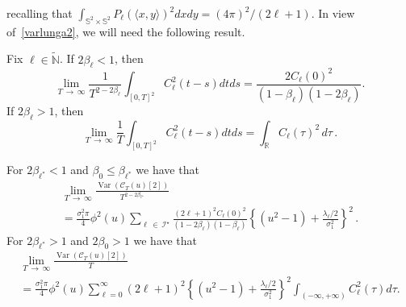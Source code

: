 \documentclass[AHL,Unicode,longabstracts,published]{cedram}
\newcommand{\clI}{\mathcal{I}}
\newcommand{\clC}{\mathcal{C}}
\newcommand{\bbS}{\mathbb{S}}
\newcommand{\bbR}{\mathbb{R}}
\newcommand{\bbN}{\mathbb{N}}
\DeclareMathOperator{\Var}{Var}
\begin{document}
\endgroup
\noindent recalling that $\int_{\bbS^{2}\times \bbS^{2}}P_{\ell }(\langle x,y\rangle)^{2}dxdy = (4\pi)^2/(2\ell+1)$. In view of~\eqref{varlunga2}, we will need the following result.

\begin{lemm}\label{lemma-var2nd}
Fix $\ell \in \widetilde{ \bbN}$. If $2\beta _{\ell}<1$, then
\begin{equation*}
\lim_{T\,\rightarrow\,\infty}\frac{1}{T^{2-2\beta _{\ell }}}
\int_{[0,T]^2}C_{\ell }^{2}(t-s)dtds=\frac{2C_{\ell }(0)^{2}}{ (1-\beta_{\ell})(1-2\beta_{\ell})}\text{.}
\end{equation*}
If $2\beta _{\ell}>1$, then
\begin{equation*}
\lim_{T\,\rightarrow\,\infty}\frac{1}{T}\int_{[0,T]^2}C_{\ell }^{2}(t-s)dtds=\int_{\bbR}C_\ell(\tau)^2\, d\tau\,.
\end{equation*}
\end{lemm}

\begin{prop}\label{prop:var-2nd-chaos}
For $2\beta_{\ell^*}<1$ and $\beta_0\le
\beta_{\ell^*}$ we have that
\begin{multline}
\lim_{T\,\rightarrow\,\infty }\frac{\Var\left(\clC _{T}(u)[2]\right) }{T^{2-2\beta _{\ell^{\star}}}}\\
=\frac{\sigma _{1}^{2}\pi }{4}\phi^{2}(u)\sum_{\ell\,\in\,\clI^\star}\frac{(2\ell+1)^{2}C_
\ell(0)^2}{(1-2\beta_\ell)(1-\beta_\ell)}\left\{\left(u^{2}-1\right)+\frac{\lambda _{\ell}/2}{\sigma_{1}^{2}}\right\}^2\,.
\end{multline}
For $2\beta_{\ell^*} >1$ and $2\beta_0 >1$ we have that
\begin{multline}\label{T2}
\lim_{T\,\rightarrow\,\infty }\frac{\Var\left(\clC _{T}(u)[2]\right) }{T}
\\= \frac{\sigma _{1}^{2}\pi}{4}\phi ^{2}(u)\sum_{\ell=0}^{\infty}(2\ell+1)^{2} \left\{ (u^{2}-1)+\frac{\lambda _{\ell}/2}{\sigma_{1}^{2}}\right\}^2 \int_{(-\infty, +\infty)}C_{\ell }^{2}(\tau)d\tau.
\end{multline}
\end{prop}
\end{document}
